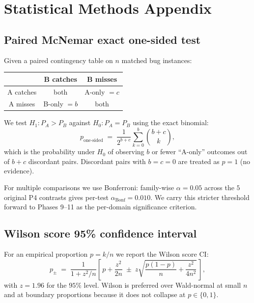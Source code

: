 \section{Statistical Methods Appendix}
\label{app:stats}

\subsection{Paired McNemar exact one-sided test~\cite{mcnemar1947note}}

Given a paired contingency table on $n$ matched bug instances:
\begin{center}
\begin{tabular}{c|cc}
 & B catches & B misses \\
\hline
A catches & both & A-only $= c$ \\
A misses & B-only $= b$ & both \\
\end{tabular}
\end{center}

We test $H_1: P_A > P_B$ against $H_0: P_A = P_B$ using the exact binomial:
\begin{equation}
  p_{\text{one-sided}} \;=\; \frac{1}{2^{b+c}} \sum_{k=0}^{b} \binom{b+c}{k},
  \label{eq:mcnemar-one-sided}
\end{equation}
which is the probability under $H_0$ of observing $b$ or fewer ``A-only'' outcomes out of $b+c$ discordant pairs. Discordant pairs with $b = c = 0$ are treated as $p = 1$ (no evidence).

For multiple comparisons we use Bonferroni: family-wise $\alpha = 0.05$ across the $5$ original P4 contrasts gives per-test $\alpha_{\mathrm{Bonf}} = 0.010$. We carry this stricter threshold forward to Phases 9--11 as the per-domain significance criterion.

\subsection{Wilson score 95\% confidence interval~\cite{wilson1927probable}}

For an empirical proportion $p = k/n$ we report the Wilson score CI:
\begin{equation}
  p_{\pm} \;=\; \frac{1}{1 + z^2/n} \left[\, p + \frac{z^2}{2n} \;\pm\; z\sqrt{\frac{p(1-p)}{n} + \frac{z^2}{4n^2}}\, \right],
  \label{eq:wilson-ci}
\end{equation}
with $z = 1.96$ for the $95\%$ level. Wilson is preferred over Wald-normal at small $n$ and at boundary proportions because it does not collapse at $p \in \{0, 1\}$.

